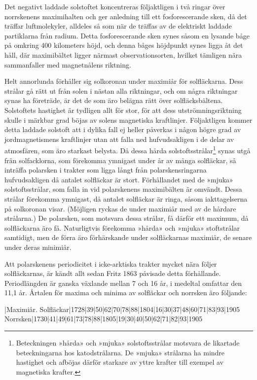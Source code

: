 \documentclass[a4paper, 12pt, oneside, swedish]{article}
\begin{document}
Det negativt laddade solstoftet koncentreras följaktligen i två ringar över norrskenens maximihalten och ger anledning till ett fosforescerande sken, då det träffar luftmolekyler, alldeles så som när de träffas av de elektriskt laddade partiklarna från radium. Detta fosforescerande sken synes såsom en lysande båge på omkring 400 kilometers höjd, och denna båges höjdpunkt synes ligga åt det håll, där maximibältet ligger närmast observationsorten, hvilket tämligen nära sammanfaller med magnetnålens riktning.

Helt annorlunda förhåller sig solkoronan under maximiår för solfläckarna. Dess strålar gå rätt ut från solen i nästan alla riktningar, och om några riktningar synas ha företräde, är det de som äro belägna rätt över solfläcksbältena. Solstoftets hastighet är tydligen allt för stor, för att dess utströmningsriktning skulle i märkbar grad böjas av solens magnetiska kraftlinjer. Följaktligen kommer detta laddade solstoft att i dylika fall ej heller påverkas i någon högre grad av jordmagnetismens kraftlinjer utan att falla ned hufvudsakligen i de delar av atmosfären, som äro starkast belysta. Då dessa hårda solstoftsstrålar\footnote{Beteckningen »hårda» och »mjuka» solstoftsstrålar motsvara de likartade beteckningarna hos katodstrålarna. De »mjuka» strålarna ha mindre hastighet och afböjas därför starkare av yttre krafter till exempel av magnetiska krafter.} synas utgå från solfacklorna, som förekomma ymnigast under år av många solfläckar, så inträffa polarsken i trakter som ligga långt från polarskensringarna hufvudsakligen då antalet solfläckar är stort. Förhållandet med de »mjuka» solstoftsstrålar, som falla in vid polarskenens maximibälten är omvändt. Dessa strålar förekomma ymnigast, då antalet solfläckar är ringa, såsom iakttagelserna på solkoronan visar. (Möjligen ryckas de under maximiår med av de hårdare strålarna.) De polarsken, som motsvara dessa strålar, få därför ett maximum, då solfläckarna äro få. Naturligtvis förekomma »hårda» och »mjuka» stoftstrålar samtidigt, men de förra äro förhärskande under solfläckarnas maximiår, de senare under deras minimiår.

Att polarskenens periodicitet i icke-arktiska trakter mycket nära följer solfläckarnas, är kändt allt sedan Fritz 1863 påvisade detta förhållande. Periodlängden är ganska växlande mellan 7 och 16 år, i medeltal omfattar den 11,1 år. Årtalen för maxima och minima av solfläckar och norrsken äro följande:

|Maximiår.  
Solfläckar|1728|39|50|62|70|78|88|1804|16|30|37|48|60|71|83|93|1905  
Norrsken|1730|41|49|61|73|78|88|1805|19|30|40|50|62|71|82|93|1905  
\end{document}
